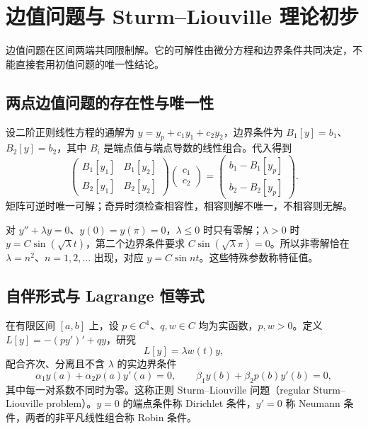 \setcounter{chapter}{11} %
\chapter{边值问题与 Sturm--Liouville 理论初步}
\label{chap:ode-boundary}

边值问题在区间两端共同限制解。它的可解性由微分方程和边界条件共同决定，不能直接套用初值问题的唯一性结论。

\section{两点边值问题的存在性与唯一性}
设二阶正则线性方程的通解为 $y=y_p+c_1y_1+c_2y_2$，边界条件为 $B_1[y]=b_1$、$B_2[y]=b_2$，其中 $B_i$ 是端点值与端点导数的线性组合。代入得到
\[
 \begin{pmatrix}B_1[y_1]&B_1[y_2]\\B_2[y_1]&B_2[y_2]\end{pmatrix}
 \begin{pmatrix}c_1\\c_2\end{pmatrix}
 =\begin{pmatrix}b_1-B_1[y_p]\\b_2-B_2[y_p]\end{pmatrix}.
\]
矩阵可逆时唯一可解；奇异时须检查相容性，相容则解不唯一，不相容则无解。

\begin{example}
对 $y''+\lambda y=0$、$y(0)=y(\pi)=0$，$\lambda\leq0$ 时只有零解；$\lambda>0$ 时 $y=C\sin(\sqrt\lambda t)$，第二个边界条件要求 $C\sin(\sqrt\lambda\pi)=0$。所以非零解恰在 $\lambda=n^2$、$n=1,2,\ldots$ 出现，对应 $y=C\sin nt$。这些特殊参数称特征值。
\end{example}

\section{自伴形式与 Lagrange 恒等式}
在有限区间 $[a,b]$ 上，设 $p\in C^1$、$q,w\in C$ 均为实函数，$p,w>0$。定义 $L[y]=-(py')'+qy$，研究
\begin{equation}
 L[y]=\lambda w(t)y,
 \label{eq:ode-sturm-liouville}
\end{equation}
配合齐次、分离且不含 $\lambda$ 的实边界条件
\[
 \alpha_1y(a)+\alpha_2p(a)y'(a)=0,\qquad
 \beta_1y(b)+\beta_2p(b)y'(b)=0,
\]
其中每一对系数不同时为零。这称正则 Sturm--Liouville 问题（regular Sturm--Liouville problem）。$y=0$ 的端点条件称 Dirichlet 条件，$y'=0$ 称 Neumann 条件，两者的非平凡线性组合称 Robin 条件。

